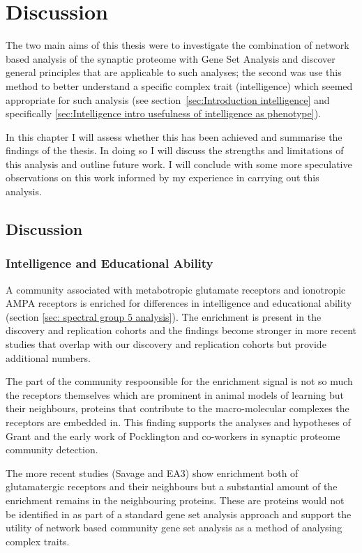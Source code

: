 \chapter{Discussion}

The two main aims of this thesis were to investigate the combination of network based analysis of the synaptic proteome with Gene Set Analysis and discover general  principles that are applicable to such analyses; the second was use this method to better understand a specific complex trait (intelligence) which seemed appropriate for such analysis (see section~\ref{sec:Introduction intelligence} and specifically  \ref{sec:Intelligence intro usefulness of intelligence as phenotype}).

In this chapter I will assess whether this has been achieved and summarise the findings of the thesis. In doing so I will discuss the strengths and limitations of this analysis and outline future work. I will conclude with some more speculative observations on this work informed by my experience in carrying out this analysis.

\section{Discussion}
\subsection{Intelligence and Educational Ability}
A  community associated with metabotropic glutamate receptors and ionotropic AMPA receptors is enriched for differences in intelligence and educational ability (section \ref{sec: spectral group 5 analysis}). The enrichment is present in the discovery and replication cohorts and the findings become stronger in more recent studies that overlap with our discovery and replication cohorts but provide additional numbers. 

The part of the community respoonsible for the enrichment signal is not so much the receptors themselves which are prominent in animal models of learning but their neighbours, proteins that contribute to the macro-molecular complexes the receptors are embedded in. This finding supports the analyses and hypotheses of Grant \cite{grant2012synaptopathies} and the early work of Pocklington and co-workers \cite{pocklington2006proteomes} in synaptic proteome community detection. 

The more recent studies (Savage and EA3)\cite{savage2018genome} \cite{lee2018gene} show enrichment both of glutamatergic receptors and their neighbours but a substantial amount of the enrichment remains in the neighbouring proteins. These are proteins would not be identified in as part of a standard gene set analysis approach and support the utility of network based community gene set analysis as a method of analysing complex traits. 

